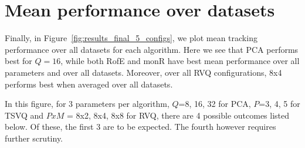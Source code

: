 \section{Mean performance over datasets}
Finally, in Figure~\ref{fig:results_final_5_configs}, we plot mean tracking performance over all datasets for each algorithm.  Here we see that PCA performs best for $Q=16$, while both RofE and monR have best mean performance over all parameters and over all datasets.  Moreover, over all RVQ configurations, 8x4 performs best when averaged over all datasets.

In this figure, for 3 parameters per algorithm, $Q$=8, 16, 32 for PCA, $P$=3, 4, 5 for TSVQ and $PxM$ = 8x2, 8x4, 8x8 for RVQ, there are 4 possible outcomes listed below.  Of these, the first 3 are to be expected.  The fourth however requires further scrutiny.

